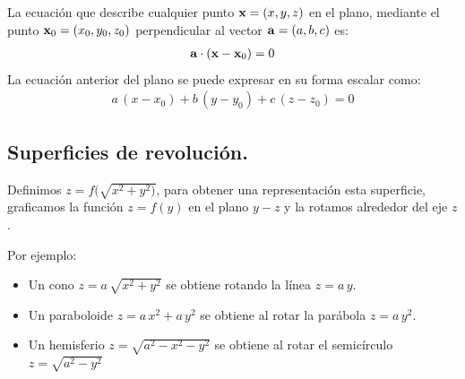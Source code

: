 La ecuación que describe cualquier punto $ \vb{x} = (x, y, z)$ en el plano, mediante el punto $\vb{x}_{0} = (x_{0}, y_{0}, z_{0})$ perpendicular al vector $\vb{a} = (a, b, c)$ es:
\begin{align*}
\vb{a} \cdot (\vb{x} - \vb{x}_{0}) = 0
\end{align*}
La ecuación anterior del plano se puede expresar en su forma escalar como:
\begin{align*}
a \, (x - x_{0}) + b \, (y - y_{0}) + c \, (z -z_{0}) = 0
\end{align*}

\subsection{Superficies de revolución.}

Definimos $z = f(\sqrt{x^{2} + y^{2})}$, para obtener una representación esta superficie, graficamos la función $z = f(y)$ en el plano $y-z$ y la rotamos  alrededor del eje $z$.
\par
Por ejemplo:
\begin{itemize}
\item Un cono $z = a \, \sqrt{x^{2} + y^{2}}$ se obtiene rotando la línea $z = a \, y$.
\item Un paraboloide $z = a \, x^{2} + a \, y^{2}$ se obtiene al rotar la parábola $z = a \, y^{2}$.
\item Un hemisferio $z = \sqrt{a^{2} - x^{2} - y^{2}}$ se obtiene al rotar el semicírculo $z = \sqrt{a^{2} -y^{2}}$
\end{itemize}


